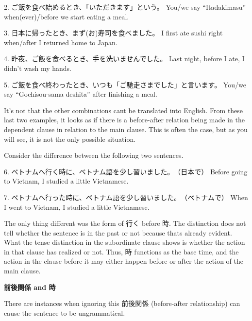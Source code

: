 \par{2. ご飯を食べ始めるとき、「いただきます」という。 \hfill\break
You\slash we say “Itadakimasu” when(ever)\slash before we start eating a meal. }

\par{3. 日本に帰ったとき、まず(お)寿司を食べました。 \hfill\break
I first ate sushi right when\slash after I returned home to Japan. }

\par{4. 昨夜、ご飯を食べるとき、手を洗いませんでした。 \hfill\break
Last night, before I ate, I didn't wash my hands. }

\par{5. ご飯を食べ終わったとき、いつも「ご馳走さまでした」と言います。 \hfill\break
You\slash we say “Gochisou-sama deshita” after finishing a meal. }

\par{ It's not that the other combinations can\textquotesingle t be translated into English. From these last two examples, it looks as if there is a before-after relation being made in the dependent clause in relation to the main clause. This is often the case, but as you will see, it is not the only possible situation. }

\par{ Consider the difference between the following two sentences. }

\par{6. ベトナムへ行く時に、ベトナム語を少し習いました。　（日本で） \hfill\break
Before going to Vietnam, I studied a little Vietnamese. }

\par{7. ベトナムへ行った時に、ベトナム語を少し習いました。　（ベトナムで） \hfill\break
When I went to Vietnam, I studied a little Vietnamese. }

\par{ The only thing different was the form of 行く before 時. The distinction does not tell whether the sentence is in the past or not because that\textquotesingle s already evident. What the tense distinction in the subordinate clause shows is whether the action in that clause has realized or not. Thus, 時 functions as the base time, and the action in the clause before it may either happen before or after the action of the main clause. }

\begin{center}
\textbf{前後関係 and 時 }
\end{center}

\par{ There are instances when ignoring this 前後関係 (before-after relationship) can cause the sentence to be ungrammatical. }

